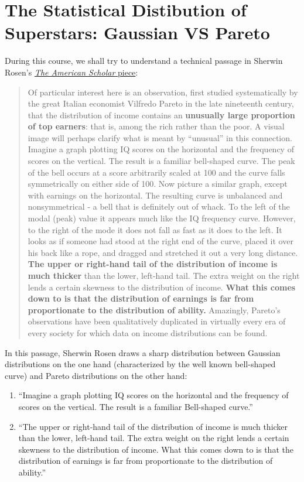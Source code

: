 \documentclass[]{book}
\theoremstyle{definition}
\theoremstyle{definition}
\theoremstyle{definition}
\theoremstyle{remark}
\begin{document}
\hypertarget{statistics-superstars}{\chapter{The Statistical Distibution
of Superstars: Gaussian VS Pareto}\label{statistics-superstars}}

During this course, we shall try to understand a technical passage in
Sherwin Rosen's \href{https://www.jstor.org/stable/41210977}{\emph{The
American Scholar} piece}:

\begin{quote}
Of particular interest here is an observation, first studied
systematically by the great Italian economist Vilfredo Pareto in the
late nineteenth century, that the distribution of income contains an
\textbf{unusually large proportion of top earners}: that is, among the
rich rather than the poor. A visual image will perhaps clarify what is
meant by ``unusual'' in this connection. Imagine a graph plotting IQ
scores on the horizontal and the frequency of scores on the vertical.
The result is a familiar bell-shaped curve. The peak of the bell occurs
at a score arbitrarily scaled at 100 and the curve falls symmetrically
on either side of 100. Now picture a similar graph, except with earnings
on the horizontal. The resulting curve is unbalanced and nonsymmetrical
- a bell that is definitely out of whack. To the left of the modal
(peak) value it appears much like the IQ frequency curve. However, to
the right of the mode it does not fall as fast as it does to the left.
It looks as if someone had stood at the right end of the curve, placed
it over his back like a rope, and dragged and stretched it out a very
long distance. \textbf{The upper or right-hand tail of the distribution
of income is much thicker} than the lower, left-hand tail. The extra
weight on the right lends a certain skewness to the distribution of
income. \textbf{What this comes down to is that the distribution of
earnings is far from proportionate to the distribution of ability.}
Amazingly, Pareto's observations have been qualitatively duplicated in
virtually every era of every society for which data on income
distributions can be found.
\end{quote}

In this passage, Sherwin Rosen draws a sharp distribution between
Gaussian distributions on the one hand (characterized by the well known
bell-shaped curve) and Pareto distributions on the other hand:

\begin{enumerate}
\def\labelenumi{\arabic{enumi}.}
\item
  ``Imagine a graph plotting IQ scores on the horizontal and the
  frequency of scores on the vertical. The result is a familiar
  Bell-shaped curve.''
\item
  ``The upper or right-hand tail of the distribution of income is much
  thicker than the lower, left-hand tail. The extra weight on the right
  lends a certain skewness to the distribution of income. What this
  comes down to is that the distribution of earnings is far from
  proportionate to the distribution of ability.''
\end{enumerate}
\end{document}
